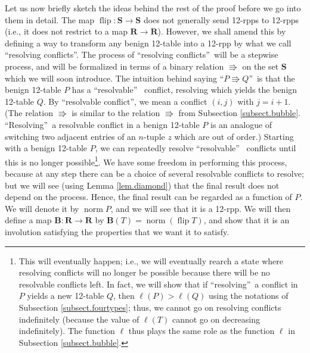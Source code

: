 \documentclass[numbers=enddot,12pt,final,onecolumn,notitlepage]{scrartcl}%
\theoremstyle{definition}
\begin{document}
Let us now briefly sketch the ideas behind the rest of the proof before we go
into them in detail. The map $\operatorname*{flip}:\mathbf{S}\rightarrow
\mathbf{S}$ does not generally send 12-rpps to 12-rpps (i.e., it does not
restrict to a map $\mathbf{R}\rightarrow\mathbf{R}$). However, we shall amend
this by defining a way to transform any benign 12-table into a 12-rpp by what
we call \textquotedblleft resolving conflicts\textquotedblright. The process
of \textquotedblleft resolving conflicts\textquotedblright\ will be a stepwise
process, and will be formalized in terms of a binary relation $\Rrightarrow$
on the set $\mathbf{S}$ which we will soon introduce. The intuition behind
saying \textquotedblleft$P\Rrightarrow Q$\textquotedblright\ is that the
benign 12-table $P$ has a \textquotedblleft resolvable\textquotedblright%
\ conflict, resolving which yields the benign 12-table $Q$. By
\textquotedblleft resolvable conflict\textquotedblright, we mean a conflict
$\left(  i,j\right)  $ with $j=i+1$. (The relation $\Rrightarrow$ is similar
to the relation $\Rrightarrow$ from Subsection \ref{subsect.bubble}.
\textquotedblleft Resolving\textquotedblright\ a resolvable conflict in a
benign 12-table $P$ is an analogue of switching two adjacent entries of an
$n$-tuple $z$ which are out of order.) Starting with a benign 12-table $P$, we
can repeatedly resolve \textquotedblleft resolvable\textquotedblright%
\ conflicts until this is no longer possible\footnote{This will eventually
happen; i.e., we will eventually rearch a state where resolving conflicts will
no longer be possible because there will be no resolvable conflicts left. In
fact, we will show that if \textquotedblleft resolving\textquotedblright\ a
conflict in $P$ yields a new 12-table $Q$, then $\ell\left(  P\right)
>\ell\left(  Q\right)  $ using the notations of Subsection
\ref{subsect.fourtypes}; thus, we cannot go on resolving conflicts
indefinitely (because the value of $\ell\left(  T\right)  $ cannot go on
decreasing indefinitely). The function $\ell$ thus plays the same role as the
function $\ell$ in Subsection \ref{subsect.bubble}.}. We have some freedom in
performing this process, because at any step there can be a choice of several
resolvable conflicts to resolve; but we will see (using Lemma
\ref{lem.diamond}) that the final result does not depend on the process.
Hence, the final result can be regarded as a function of $P$. We will denote
it by $\operatorname*{norm}P$, and we will see that it is a 12-rpp. We will
then define a map $\mathbf{B}:\mathbf{R}\rightarrow\mathbf{R}$ by
$\mathbf{B}\left(  T\right)  =\operatorname*{norm}\left(  \operatorname*{flip}%
T\right)  $, and show that it is an involution satisfying the properties that
we want it to satisfy.
\end{document}
